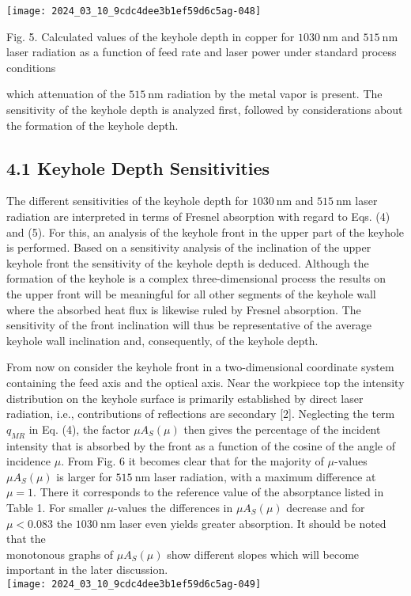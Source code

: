 \documentclass[10pt]{article}
\begin{document}
\begin{center}
\texttt{[image: 2024\_03\_10\_9cdc4dee3b1ef59d6c5ag-048]}
\end{center}

Fig. 5. Calculated values of the keyhole depth in copper for $1030 \mathrm{~nm}$ and $515 \mathrm{~nm}$ laser radiation as a function of feed rate and laser power under standard process conditions

which attenuation of the $515 \mathrm{~nm}$ radiation by the metal vapor is present. The sensitivity of the keyhole depth is analyzed first, followed by considerations about the formation of the keyhole depth.

\subsection*{4.1 Keyhole Depth Sensitivities}
The different sensitivities of the keyhole depth for $1030 \mathrm{~nm}$ and $515 \mathrm{~nm}$ laser radiation are interpreted in terms of Fresnel absorption with regard to Eqs. (4) and (5). For this, an analysis of the keyhole front in the upper part of the keyhole is performed. Based on a sensitivity analysis of the inclination of the upper keyhole front the sensitivity of the keyhole depth is deduced. Although the formation of the keyhole is a complex three-dimensional process the results on the upper front will be meaningful for all other segments of the keyhole wall where the absorbed heat flux is likewise ruled by Fresnel absorption. The sensitivity of the front inclination will thus be representative of the average keyhole wall inclination and, consequently, of the keyhole depth.

From now on consider the keyhole front in a two-dimensional coordinate system containing the feed axis and the optical axis. Near the workpiece top the intensity distribution on the keyhole surface is primarily established by direct laser radiation, i.e., contributions of reflections are secondary [2]. Neglecting the term $q_{M R}$ in Eq. (4), the factor $\mu A_{S}(\mu)$ then gives the percentage of the incident intensity that is absorbed by the front as a function of the cosine of the angle of incidence $\mu$. From Fig. 6 it becomes clear that for the majority of $\mu$-values $\mu A_{S}(\mu)$ is larger for $515 \mathrm{~nm}$ laser radiation, with a maximum difference at $\mu=1$. There it corresponds to the reference value of the absorptance listed in Table 1. For smaller $\mu$-values the differences in $\mu A_{S}(\mu)$ decrease and for $\mu<0.083$ the $1030 \mathrm{~nm}$ laser even yields greater absorption. It should be noted that the\\
monotonous graphs of $\mu A_{S}(\mu)$ show different slopes which will become important in the later discussion.\\
\texttt{[image: 2024\_03\_10\_9cdc4dee3b1ef59d6c5ag-049]}
\end{document}
